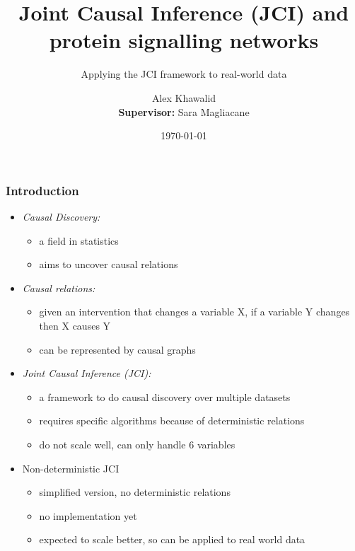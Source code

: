 \documentclass[10pt, compress]{beamer}
\title{Joint Causal Inference (JCI) and protein signalling networks}
\subtitle{Applying the JCI framework to real-world data}
\date{\today}
\author{Alex Khawalid\\\textbf{Supervisor:} Sara Magliacane}
\institute{Universiteit van Amsterdam}
\begin{document}
\maketitle


\begin{frame}
    \frametitle{Introduction}
    \begin{itemize}
        \item \textit{Causal Discovery:} \begin{itemize}
            \item a field in statistics
            \item aims to uncover causal relations
        \end{itemize}
        \item \textit{Causal relations:}\begin{itemize}
            \item given an intervention that changes a variable X, if a variable Y changes then X causes Y
            \item can be represented by causal graphs
        \end{itemize}
        \item \textit{Joint Causal Inference (JCI):} \begin{itemize}
            \item a framework to do causal discovery over multiple datasets
            \item requires specific algorithms because of deterministic relations
            \item do not scale well, can only handle 6 variables %
        \end{itemize}
        \item Non-deterministic JCI \begin{itemize}
            \item simplified version, no deterministic relations
            \item no implementation yet
            \item expected to scale better, so can be applied to real world data
        \end{itemize}
    \end{itemize}
\end{frame}
\end{document}
